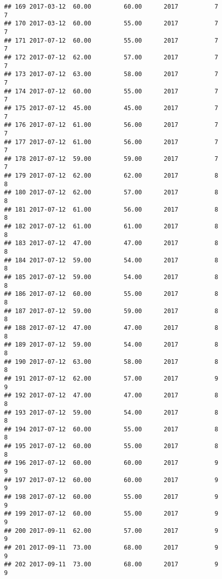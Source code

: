 \documentclass[]{article}
\begin{document}
\begin{verbatim}
## 169 2017-03-12  60.00         60.00      2017          7                 7
## 170 2017-03-12  60.00         55.00      2017          7                 7
## 171 2017-07-12  60.00         55.00      2017          7                 7
## 172 2017-07-12  62.00         57.00      2017          7                 7
## 173 2017-07-12  63.00         58.00      2017          7                 7
## 174 2017-07-12  60.00         55.00      2017          7                 7
## 175 2017-07-12  45.00         45.00      2017          7                 7
## 176 2017-07-12  61.00         56.00      2017          7                 7
## 177 2017-07-12  61.00         56.00      2017          7                 7
## 178 2017-07-12  59.00         59.00      2017          7                 7
## 179 2017-07-12  62.00         62.00      2017          8                 8
## 180 2017-07-12  62.00         57.00      2017          8                 8
## 181 2017-07-12  61.00         56.00      2017          8                 8
## 182 2017-07-12  61.00         61.00      2017          8                 8
## 183 2017-07-12  47.00         47.00      2017          8                 8
## 184 2017-07-12  59.00         54.00      2017          8                 8
## 185 2017-07-12  59.00         54.00      2017          8                 8
## 186 2017-07-12  60.00         55.00      2017          8                 8
## 187 2017-07-12  59.00         59.00      2017          8                 8
## 188 2017-07-12  47.00         47.00      2017          8                 8
## 189 2017-07-12  59.00         54.00      2017          8                 8
## 190 2017-07-12  63.00         58.00      2017          8                 8
## 191 2017-07-12  62.00         57.00      2017          9                 9
## 192 2017-07-12  47.00         47.00      2017          8                 8
## 193 2017-07-12  59.00         54.00      2017          8                 8
## 194 2017-07-12  60.00         55.00      2017          8                 8
## 195 2017-07-12  60.00         55.00      2017          8                 8
## 196 2017-07-12  60.00         60.00      2017          9                 9
## 197 2017-07-12  60.00         60.00      2017          9                 9
## 198 2017-07-12  60.00         55.00      2017          9                 9
## 199 2017-07-12  60.00         55.00      2017          9                 9
## 200 2017-09-11  62.00         57.00      2017          9                 9
## 201 2017-09-11  73.00         68.00      2017          9                 9
## 202 2017-09-11  73.00         68.00      2017          9                 9

\end{verbatim}
\end{document}
